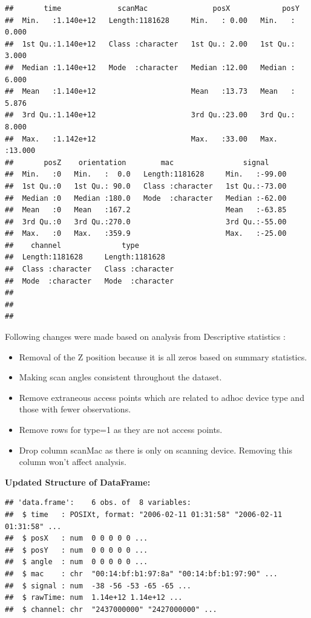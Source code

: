 \documentclass[
]{article}
\providecommand{\tightlist}{%
  \setlength{\itemsep}{0pt}\setlength{\parskip}{0pt}}
\begin{document}
\begin{verbatim}
##       time             scanMac               posX            posY       
##  Min.   :1.140e+12   Length:1181628     Min.   : 0.00   Min.   : 0.000  
##  1st Qu.:1.140e+12   Class :character   1st Qu.: 2.00   1st Qu.: 3.000  
##  Median :1.140e+12   Mode  :character   Median :12.00   Median : 6.000  
##  Mean   :1.140e+12                      Mean   :13.73   Mean   : 5.876  
##  3rd Qu.:1.140e+12                      3rd Qu.:23.00   3rd Qu.: 8.000  
##  Max.   :1.142e+12                      Max.   :33.00   Max.   :13.000  
##       posZ    orientation        mac                signal      
##  Min.   :0   Min.   :  0.0   Length:1181628     Min.   :-99.00  
##  1st Qu.:0   1st Qu.: 90.0   Class :character   1st Qu.:-73.00  
##  Median :0   Median :180.0   Mode  :character   Median :-62.00  
##  Mean   :0   Mean   :167.2                      Mean   :-63.85  
##  3rd Qu.:0   3rd Qu.:270.0                      3rd Qu.:-55.00  
##  Max.   :0   Max.   :359.9                      Max.   :-25.00  
##    channel              type          
##  Length:1181628     Length:1181628    
##  Class :character   Class :character  
##  Mode  :character   Mode  :character  
##                                       
##                                       
## 
\end{verbatim}

Following changes were made based on analysis from Descriptive
statistics :

\begin{itemize}
\tightlist
\item
  Removal of the Z position because it is all zeros based on summary
  statistics.
\item
  Making scan angles consistent throughout the dataset.
\item
  Remove extraneous access points which are related to adhoc device type
  and those with fewer observations.
\item
  Remove rows for type=1 as they are not access points.
\item
  Drop column scanMac as there is only on scanning device. Removing this
  column won't affect analysis.
\end{itemize}

\textbf{Updated Structure of DataFrame:}

\begin{verbatim}
## 'data.frame':    6 obs. of  8 variables:
##  $ time   : POSIXt, format: "2006-02-11 01:31:58" "2006-02-11 01:31:58" ...
##  $ posX   : num  0 0 0 0 0 ...
##  $ posY   : num  0 0 0 0 0 ...
##  $ angle  : num  0 0 0 0 0 ...
##  $ mac    : chr  "00:14:bf:b1:97:8a" "00:14:bf:b1:97:90" ...
##  $ signal : num  -38 -56 -53 -65 -65 ...
##  $ rawTime: num  1.14e+12 1.14e+12 ...
##  $ channel: chr  "2437000000" "2427000000" ...
\end{verbatim}
\end{document}
